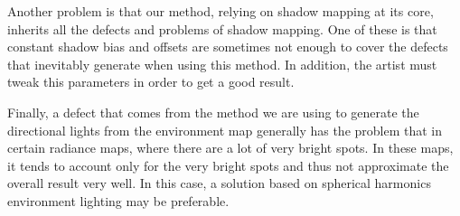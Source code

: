 Another problem is that our method, relying on shadow mapping at its core, inherits all the defects and problems of shadow mapping. One of these is that constant shadow bias and offsets are sometimes not enough to cover the defects that inevitably generate when using this method. In addition, the artist must tweak this parameters in order to get a good result.  

Finally, a defect that comes from the method we are using to generate the directional lights from the environment map generally has the problem that in certain radiance maps, where there are a lot of very bright spots. In these maps, it tends to account only for the very bright spots and thus not approximate the overall result very well. In this case, a solution based on spherical harmonics \citep{peterpikeconference} environment lighting may be preferable.
